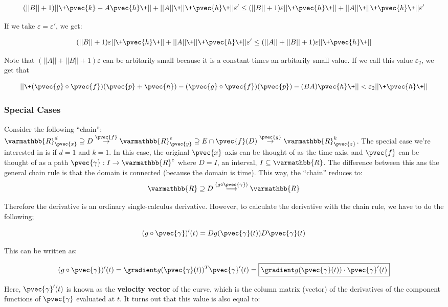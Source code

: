 \documentclass[11 pt, twoside]{article}
\begin{document}
\[
(||B|| + 1) ||\+\pvec{k} - A\pvec{h}\+|| + ||A||\+||\+\pvec{h}\+||\varepsilon'
\leq (||B|| + 1) \varepsilon ||\+\pvec{h}\+|| + ||A|| \+ ||\+\pvec{h}\+||
\varepsilon'
\]

If we take $\varepsilon = \varepsilon'$, we get:

\[
(||B|| + 1) \varepsilon ||\+\pvec{h}\+|| + ||A|| \+ ||\+\pvec{h}\+||
\varepsilon' \leq (||A|| + ||B|| + 1) \varepsilon ||\+\pvec{h}\+||
\]

Note that $(||A|| + ||B|| + 1) \varepsilon$ can be arbitarily small because it
is a constant times an arbitarily small value. If we call this value
$\varepsilon_2$, we get that

\[
||\+(\pvec{g} \circ \pvec{f})(\pvec{p} + \pvec{h}) - (\pvec{g} \circ
\pvec{f})(\pvec{p}) - (BA) \pvec{h}\+||
< \varepsilon_2 ||\+\pvec{h}\+||
\]

\subsubsection{Special Cases}

Consider the following ``chain'': $\varmathbb{R}^d_{\pvec{x}} \supseteq D
\overset{\pvec{f}}{\to} \varmathbb{R}^e_{\pvec{y}} \supseteq E \cap \pvec{f}(D)
\overset{\pvec{g}}{\to} \varmathbb{R}^k_{\pvec{z}}$. The special case we're
interested in is if $d = 1$ and $k = 1$. In this case, the original $\pvec{x}$-axis can be
thought of as the time axis, and $\pvec{f}$ can be thought of as a path
$\pvec{\gamma}: I \to \varmathbb{R}^e$ where $D = I$, an interval, $I \subseteq
\varmathbb{R}$. The difference between this ans the general chain rule is that
the domain is connected (because the domain is time). This way, the ``chain''
reduces to: 
$$\varmathbb{R} \supseteq D \overset{(g \circ
\pvec{\gamma})}{\longrightarrow} \varmathbb{R}$$

Therefore the derivative is an ordinary single-calculus derivative. However, to
calculate the derivative with the chain rule, we have to do the following;

$$(g \circ \pvec{\gamma})'(t) = Dg(\pvec{\gamma}(t))D\pvec{\gamma}(t)$$

This can be written as:

$$(g \circ \pvec{\gamma})'(t) = \gradient g(\pvec{\gamma}(t))^T \pvec{\gamma}'(t) =
\boxed{\gradient g(\pvec{\gamma}(t))\cdot\pvec{\gamma}'(t)}$$

Here, $\pvec{\gamma}'(t)$ is known as the \textbf{velocity vector} of the curve,
which is the column matrix (vector) of the derivatives of the component
functions of $\pvec{\gamma}$ evaluated at $t$. It turns out that this value is
also equal to:
\end{document}
